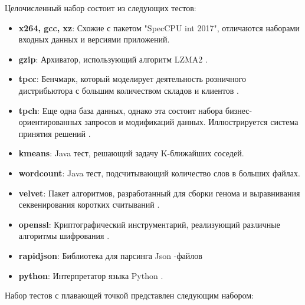 Целочисленный набор состоит из следующих тестов:
\begin{itemize}
	\item  \textbf{x264, gcc, xz}: Схожие с пакетом "SpecCPU int 2017", отличаются наборами входных данных и версиями приложений.
	\item  \textbf{gzip}: Архиватор, использующий алгоритм LZMA2 \cite{akoguz2016comparison}.
	\item  \textbf{tpcc}: Бенчмарк, который моделирует  деятельность розничного дистрибьютора с большим количеством складов и клиентов \cite{leutenegger1993modeling}.
	\item  \textbf{tpch}: Еще одна база данных, однако эта состоит набора бизнес-ориентированных запросов и модификаций данных. Иллюстрируется система принятия решений \cite{barata2015overview}.
	\item  \textbf{kmeans}: Java тест, решающий задачу K-ближайших соседей.
	\item  \textbf{wordcount}: Java тест, подсчитывающий количество слов в больших файлах. 
	\item  \textbf{velvet}: Пакет алгоритмов, разработанный для сборки генома и выравнивания секвенирования коротких считываний \cite{zerbino2008velvet}. 
	\item  \textbf{openssl}: Криптографический инструментарий, реализующий различные алгоритмы шифрования \cite{rescorla2001introduction}.
	\item  \textbf{rapidjson}: Библиотека для парсинга Json -файлов\cite{keiser2023demand}
	\item  \textbf{python}: Интерпретатор языка Python \cite{python2021python}.
\end{itemize}
Набор тестов с плавающей точкой представлен следующим набором:
